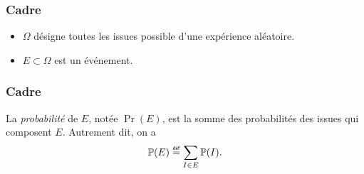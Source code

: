 \documentclass[main.tex]{subfiles}
\begin{document}
\begin{definition}

    \subsubsection{Cadre}
    \begin{itemize}
        \item $\Omega$ désigne toutes les issues possible d'une expérience aléatoire.
        \item $E \subset \Omega$ est un événement.
    \end{itemize}

    \subsubsection{Cadre}
    La \emph{probabilité} de $E$,
    notée $\Pr(E)$,
    est la somme des probabilités des issues qui composent $E$.
    Autrement dit,
    on a
    \begin{align}
        \Pr(E) \defeq \sum_{I \in E} \Pr(I).
    \end{align}
\end{definition}
\end{document}
